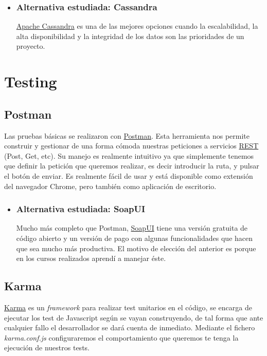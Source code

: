 \begin{itemize}
	\item	\subsubsection{Alternativa estudiada: Cassandra}\label{cassandra}
	\href{https://www.cassandra.apache.org/}{Apache Cassandra} es una de las mejores opciones cuando la escalabilidad, la alta disponibilidad y la integridad de los datos son las prioridades de un proyecto.
\end{itemize}


\section{Testing}\label{testing}


\subsection{Postman}\label{postman}
Las pruebas básicas se realizaron con  \href{https://www.getpostman.com}{Postman}. Esta herramienta nos permite construir y gestionar de una forma cómoda nuestras peticiones a servicios \href{https://es.wikipedia.org/wiki/Transferencia_de_Estado_Representacional}{REST} (Post, Get, etc). Su manejo es realmente intuitivo ya que simplemente tenemos que definir la petición que queremos realizar, es decir introducir la ruta, y pulsar el botón de enviar. Es realmente fácil de usar y está disponible como extensión del navegador Chrome, pero también como aplicación de escritorio.


\begin{itemize}
	\item	\subsubsection{Alternativa estudiada: SoapUI}
	Mucho más completo que Postman, \href{https://www.soapui.org/}{SoapUI} tiene una versión gratuita de código abierto y un versión de pago con algunas funcionalidades que hacen que sea mucho más productiva. El motivo de elección del anterior es porque en los cursos realizados aprendí a manejar éste.

\end{itemize}

\subsection{Karma}\label{karma}
\href{https://karma-runner.github.io/}{Karma} es un \emph{framework} para realizar test unitarios en el código, se encarga de ejecutar los test de Javascript según se vayan construyendo, de tal forma que ante cualquier fallo el desarrollador se dará cuenta de inmediato. Mediante el fichero \emph{karma.conf.js} configuraremos el comportamiento que queremos te tenga la ejecución de nuestros tests.

